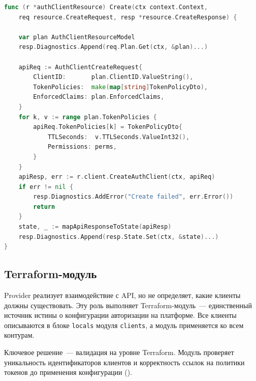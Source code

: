 \begin{lstlisting}[language=Go]
func (r *authClientResource) Create(ctx context.Context,
    req resource.CreateRequest, resp *resource.CreateResponse) {

    var plan AuthClientResourceModel
    resp.Diagnostics.Append(req.Plan.Get(ctx, &plan)...)

    apiReq := AuthClientCreateRequest{
        ClientID:       plan.ClientID.ValueString(),
        TokenPolicies:  make(map[string]TokenPolicyDto),
        EnforcedClaims: plan.EnforcedClaims,
    }
    for k, v := range plan.TokenPolicies {
        apiReq.TokenPolicies[k] = TokenPolicyDto{
            TTLSeconds:  v.TTLSeconds.ValueInt32(),
            Permissions: perms,
        }
    }
    apiResp, err := r.client.CreateAuthClient(ctx, apiReq)
    if err != nil {
        resp.Diagnostics.AddError("Create failed", err.Error())
        return
    }
    state, _ := mapApiResponseToState(apiResp)
    resp.Diagnostics.Append(resp.State.Set(ctx, &state)...)
}
\end{lstlisting}

\subsection{Terraform-модуль}\label{subsec:tf-module}

Provider реализует взаимодействие с API,
но не определяет, какие клиенты должны существовать.
Эту роль выполняет Terraform-модуль~--- единственный источник истины
о конфигурации авторизации на платформе.
Все клиенты описываются в блоке \texttt{locals}
модуля \texttt{clients},
а модуль применяется ко всем контурам.

Ключевое решение~--- валидация на уровне Terraform.
Модуль проверяет уникальность идентификаторов клиентов
и корректность ссылок на политики токенов
до применения конфигурации ().


